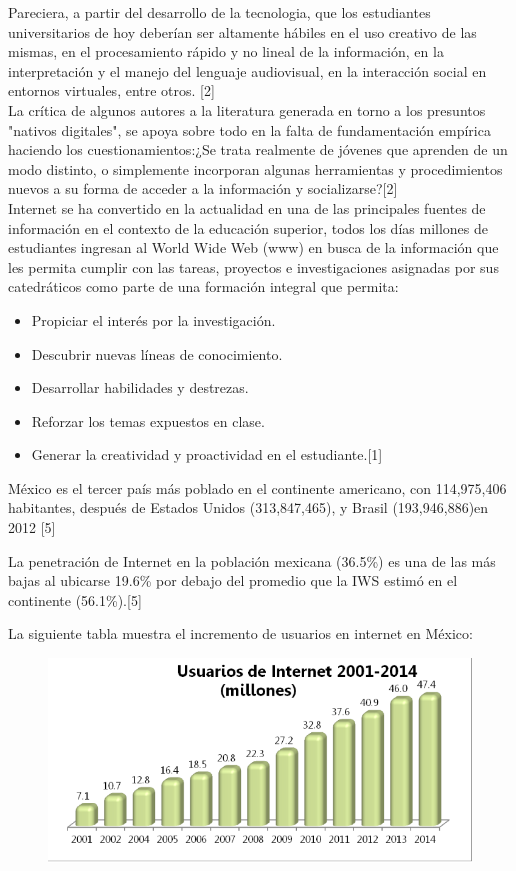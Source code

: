 \documentclass{bmcart}
\begin{document}
Pareciera, a partir del desarrollo de la tecnologia, que los estudiantes universitarios de hoy deberían ser altamente hábiles en el uso creativo de las mismas, en el procesamiento rápido y no lineal de la información, en la interpretación y el manejo del lenguaje audiovisual, en la interacción social en entornos virtuales, entre otros. [2]\\

La crítica de algunos autores a la literatura generada en torno a los presuntos "nativos digitales", se apoya sobre todo en la falta de fundamentación empírica haciendo los cuestionamientos:¿Se trata realmente de jóvenes que aprenden de un modo distinto, o simplemente incorporan algunas herramientas y procedimientos nuevos a su forma de acceder a la información y socializarse?[2]\\


 Internet se ha convertido en la actualidad en una de las principales fuentes de información en el contexto de la educación superior, todos los días millones de estudiantes ingresan al World Wide Web (www) en busca de la información que les permita cumplir con las tareas, proyectos e investigaciones asignadas por sus catedráticos como parte de una formación integral que permita:\\
 \begin{itemize}
 	\item Propiciar el interés por la investigación.
 	
 	\item Descubrir nuevas líneas de conocimiento.
 	
 	\item  Desarrollar habilidades y destrezas.
 	
 	\item Reforzar los temas expuestos en clase.
 	
 	\item Generar la creatividad y proactividad en el estudiante.[1]\\
 \end{itemize}

 México es el tercer país más poblado en el continente americano, con 114,975,406 habitantes, después de Estados Unidos (313,847,465), y Brasil (193,946,886)en 2012 [5]
 
 La penetración de Internet en la población mexicana (36.5\%) es una de las más bajas al ubicarse 19.6\% por debajo del promedio que la IWS estimó en el continente (56.1\%).[5]
 
 La siguiente tabla muestra el incremento de usuarios en internet en México:
 \begin{figure}[h]
\centering
\includegraphics[width=0.7\linewidth, height=0.2\textheight]{tabla1}
\caption{}
\label{fig:tabla1}
\end{figure}
\end{document}
